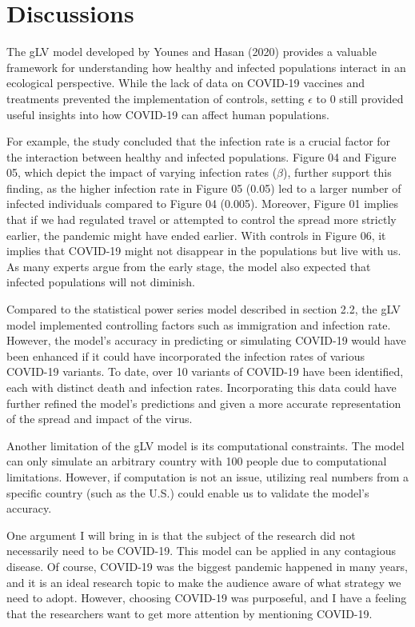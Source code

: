 \section{Discussions} \label{subm}
\hspace{5mm} The gLV model developed by Younes and Hasan (2020) provides a valuable framework for understanding how healthy and infected populations interact in an ecological perspective. While the lack of data on COVID-19 vaccines and treatments prevented the implementation of controls, setting $\epsilon$ to 0 still provided useful insights into how COVID-19 can affect human populations.

For example, the study concluded that the infection rate is a crucial factor for the interaction between healthy and infected populations. Figure 04 and Figure 05, which depict the impact of varying infection rates ($\beta$), further support this finding, as the higher infection rate in Figure 05 (0.05) led to a larger number of infected individuals compared to Figure 04 (0.005). Moreover, Figure 01 implies that if we had regulated travel or attempted to control the spread more strictly earlier, the pandemic might have ended earlier. With controls in Figure 06, it implies that COVID-19 might not disappear in the populations but live with us. As many experts argue from the early stage, the model also expected that infected populations will not diminish.

Compared to the statistical power series model described in section 2.2, the gLV model implemented controlling factors such as immigration and infection rate. However, the model's accuracy in predicting or simulating COVID-19 would have been enhanced if it could have incorporated the infection rates of various COVID-19 variants. To date, over 10 variants of COVID-19 have been identified, each with distinct death and infection rates. Incorporating this data could have further refined the model's predictions and given a more accurate representation of the spread and impact of the virus.

Another limitation of the gLV model is its computational constraints. The model can only simulate an arbitrary country with 100 people due to computational limitations. However, if computation is not an issue, utilizing real numbers from a specific country (such as the U.S.) could enable us to validate the model's accuracy.

One argument I will bring in is that the subject of the research did not necessarily need to be COVID-19. This model can be applied in any contagious disease. Of course, COVID-19 was the biggest pandemic happened in many years, and it is an ideal research topic to make the audience aware of what strategy we need to adopt. However, choosing COVID-19 was purposeful, and I have a feeling that the researchers want to get more attention by mentioning COVID-19. 

